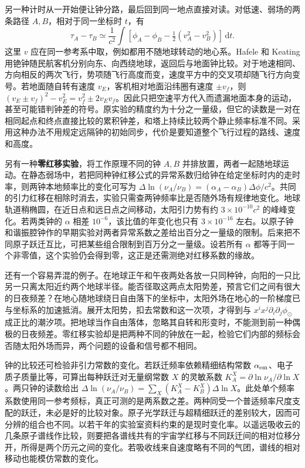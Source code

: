 另一种计时从一开始便让钟分路，最后回到同一地点直接对读。对低速、弱场的两条路径 $A,B$，相对于同一坐标时 $t$，有
\[
 \tau_A-\tau_B\simeq\frac{1}{c^2}\int
  [\phi_A-\phi_B-\tfrac12(v_A^2-v_B^2)]\,\mathrm dt .
\]
这里 $v$ 应在同一参考系中取，例如都用不随地球转动的地心系。Hafele 和 Keating 用铯钟随民航客机分别向东、向西绕地球，返回后与地面钟比较。对于地速相同、方向相反的两次飞行，势项随飞行高度而变，速度平方中的交叉项却随飞行方向变号。若地面随自转有速度 $v_E$，客机相对地面沿纬圈有速度 $\pm v_f$，则 $(v_E\pm v_f)^2-v_E^2=v_f^2\pm2v_Ev_f$。因此只把空速平方代入而遗漏地面本身的运动，甚至可能错判钟差的符号。原实验的精度约为十分之一量级，但它的读数是一对在相同起点和终点直接比较的累积钟差，和塔上持续比较两个静止频率标准不同。采用这种办法不用规定远隔钟的初始同步，代价是要知道整个飞行过程的路线、速度和高度。

另有一种\textbf{零红移实验}，将工作原理不同的钟 $A,B$ 并排放置，两者一起随地球运动。在静态弱场中，若把同种钟红移公式的异常系数归给钟在给定坐标时内的走时率，则两钟本地频率比的变化可写为 $\Delta\ln(\nu_A/\nu_B)=(\alpha_A-\alpha_B)\Delta\phi/c^2$。共同的引力红移在相除时消去，实验只需查两钟频率比是否随外场有规律地变化。地球轨道稍椭圆，在近日点和远日点之间移动，太阳引力势有约 $3\times10^{-10}c^2$ 的峰峰变化。若两类钟的 $\alpha$ 相差 $10^{-6}$，该比值的年变化也只有 $3\times10^{-16}$ 左右。以原子钟和谐振腔钟作的早期实验对两者异常系数之差给出百分之一量级的限制。后来把不同原子跃迁互比，可把某些组合限制到百万分之一量级。设若所有 $\alpha$ 都等于同一个非零值，这个实验仍会得到零，这正是还需测绝对红移系数的缘故。

还有一个容易弄混的例子。在地球正午和午夜两处各放一只同种钟，向阳的一只比另一只离太阳近约两个地球半径。能否径取这两点太阳势差，预言它们之间有很大的日夜频差？在地心随地球绕日自由落下的坐标中，太阳外场在地心的一阶梯度已与坐标系的加速抵消。展开太阳势，扣去常数和这一次项，才得到与 $x^ix^j\partial_i\partial_j\phi_\odot$ 成正比的潮汐项。把地球当作自由落体，忽略其自转和形变时，不能测到前一种偶极的日夜频差。零红移实验却是把两种不同的钟放在一起，检验它们内部的频标会否随太阳外场而异，两个问题的设备和信号都不相同。

钟的比较还可检验非引力常数的变化。若跃迁频率依赖精细结构常数 $\alpha_{\rm em}$、电子质子质量比等，可算出每种跃迁对无量纲常数 $X$ 的灵敏系数 $K_A^X=\partial\ln\nu_A/\partial\ln X$。两只钟的读数给出 $\Delta\ln(\nu_A/\nu_B)=\sum_X(K_A^X-K_B^X)\Delta\ln X$。此处单个频率系数使用同一参考频标，真正可测的是两系数之差。两种同受一个普适频率尺度支配的跃迁，未必是好的比较对象。原子光学跃迁与超精细跃迁的差别较大，因而可分辨的组合也不同。以若干年的实验室资料约束的是现时变化率。以遥远吸收云的几条原子谱线作比较，则要把各谱线共有的宇宙学红移与不同跃迁间的相对位移分开，所得是两个历元之间的变化。若吸收线来自速度略有不同的气团，谱线的相对移动也能模仿常数的变化。

